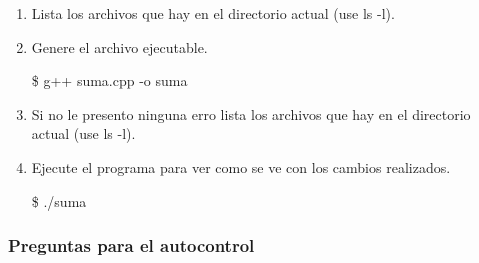 \documentclass[a4paper,12pt,spanish]{article}
\begin{document}
\begin{enumerate}
  \item Lista los archivos que hay en el directorio actual (use ls
  -l).

  \item Genere el archivo ejecutable.

  
    \begin{tcolorbox}[colback=gray!5]
    \$ g++   suma.cpp   -o   suma
  \end{tcolorbox}

  \item Si no le presento ninguna erro lista los archivos que hay en el directorio actual (use ls
    -l).

  \item Ejecute el programa para ver como se ve con los cambios realizados.
    \begin{tcolorbox}[colback=gray!5]
    \$ ./suma
  \end{tcolorbox}

\end{enumerate}





\newpage
\subsubsection{Preguntas para el autocontrol}
\label{sec:preguntas-para-el}
\end{document}
